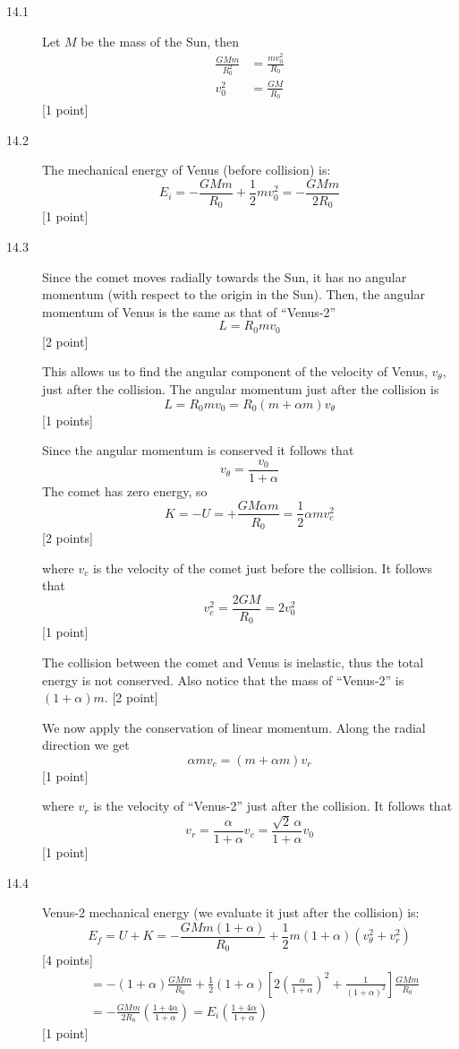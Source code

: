 \begin{description}
\item[14.1] Let $M$ be the mass of the Sun, then
  \begin{align*}
    \frac{GMm}{R_0^2} &= \frac{mv_0^2}{R_0} \\
    v_0^2 &= \frac{GM}{R_0}
  \end{align*}
  \hfill[1 point]

\item[14.2] The mechanical energy of Venus (before collision) is:
  \[
    E_i = -\frac{GMm}{R_0} + \frac{1}{2}mv_0^2 = -\frac{GMm}{2R_0}
  \]
  \hfill[1 point]

\item[14.3] Since the comet moves radially towards the Sun, it has no angular
  momentum (with respect to the origin in the Sun). Then, the angular momentum
  of Venus is the same as that of ``Venus-2''
  \[
    L = R_0 m v_0
  \]
  \hfill[2 point] %

  This allows us to find the angular component of the velocity of Venus,
  $v_\theta$, just after the collision. The angular momentum just after the
  collision is
  \[
    L = R_0 m v_0 = R_0(m + \alpha m)v_\theta
  \]
  \hfill[1 points] %

  Since the angular momentum is conserved it follows that
  \[
    v_\theta = \frac{v_0}{1 + \alpha}
  \]
  The comet has zero energy, so
  \[
    K = -U = +\frac{GM\alpha m}{R_0} = \frac{1}{2}\alpha m v_c^2
  \]
  \hfill[2 points]

  where $v_c$ is the velocity of the comet just before the collision. It
  follows that
  \[
    v_c^2 = \frac{2GM}{R_0} = 2v_0^2
  \]
  \hfill[1 point]

  The collision between the comet and Venus is inelastic, thus the total
  energy is not conserved. Also notice that the mass of ``Venus-2'' is
  $(1 + \alpha)m$. \hfill[2 point] %

  We now apply the conservation of linear momentum. Along the radial direction
  we get
  \[
    \alpha m v_c = (m + \alpha m)v_r
  \]
  \hfill[1 point]

  where $v_r$ is the velocity of ``Venus-2'' just after the collision. It
  follows that
  \[
    v_r = \frac{\alpha}{1 + \alpha}v_c = \frac{\sqrt{2}\,\alpha}{1 + \alpha}v_0
  \]
  \hfill[1 point]

\item[14.4] Venus-2 mechanical energy (we evaluate it just after the
  collision) is:
  \[
    E_f = U + K = -\frac{GMm(1 + \alpha)}{R_0}
      + \frac{1}{2}m(1 + \alpha)\left(v_\theta^2 + v_r^2\right)
  \]
  \hfill[4 points]
  \begin{align*}
    &= -(1 + \alpha)\frac{GMm}{R_0} + \frac{1}{2}(1 + \alpha)
      \left[2\left(\frac{\alpha}{1 + \alpha}\right)^2
      + \frac{1}{(1 + \alpha)^2}\right]\frac{GMm}{R_0} \\
    &= -\frac{GMm}{2R_0}\left(\frac{1 + 4\alpha}{1 + \alpha}\right)
      = E_i\left(\frac{1 + 4\alpha}{1 + \alpha}\right)
  \end{align*}
  \hfill[1 point]


\end{description}

